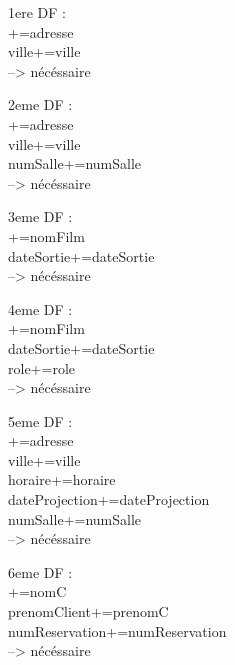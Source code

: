 \documentclass[a4paper,sffamily,12pt]{article}
\begin{document}
\noindent1ere DF :\\

+={adresse} \\
{ville}+={ville} \\
--> nécéssaire \\

\vspace{1cm}

\noindent2eme DF : \\

+={adresse} \\
{ville}+={ville} \\
{numSalle}+={numSalle} \\
--> nécéssaire \\

\vspace{1cm}

\noindent3eme DF : \\

+={nomFilm} \\
{dateSortie}+={dateSortie} \\
--> nécéssaire \\

\vspace{1cm}

\noindent4eme DF : \\

+={nomFilm} \\
{dateSortie}+={dateSortie} \\
{role}+={role} \\
--> nécéssaire \\

\vspace{1cm}

\noindent5eme DF : \\

+={adresse} \\
{ville}+={ville} \\
{horaire}+={horaire} \\
{dateProjection}+={dateProjection} \\
{numSalle}+={numSalle} \\
--> nécéssaire \\

\vspace{1cm}

\noindent6eme DF : \\

+={nomC} \\
{prenomClient}+={prenomC} \\
{numReservation}+={numReservation} \\
--> nécéssaire \\
\end{document}
